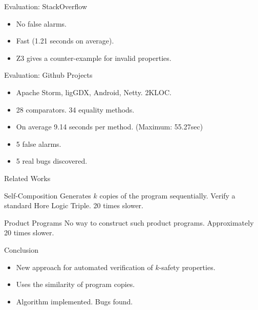 \documentclass[page number]{beamer}
\begin{document}
\begin{frame}{Evaluation: StackOverflow}
  \begin{itemize}
  \item No false alarms.
  \item Fast (1.21 seconds on average).
  \item Z3 gives a counter-example for invalid properties.
  \end{itemize}
\end{frame}

\begin{frame}{Evaluation: Github Projects}
  \begin{itemize}
  \item Apache Storm, ligGDX, Android, Netty. 2KLOC.
  \item  28 comparators. 34 equality methods.
  \item On average 9.14 seconds per method. (Maximum: 55.27sec)
  \item 5 false alarms.
  \item 5 real bugs discovered.
  \end{itemize}
\end{frame}

\begin{frame}{Related Works}
  \begin{block}{Self-Composition}
    Generates $k$ copies of the program sequentially. Verify a standard Hore Logic Triple. 20 times slower.
  \end{block}
  \vfill
  \begin{block}{Product Programs}
    No way to construct such product programs.
    Approximately 20 times slower.
  \end{block}
\end{frame}

\begin{frame}{Conclusion}
  \begin{itemize}
  \item New approach for automated verification of $k$-safety properties.
  \item Uses the similarity of program copies.
  \item Algorithm implemented. Bugs found.
  \end{itemize}
\end{frame}
\end{document}
